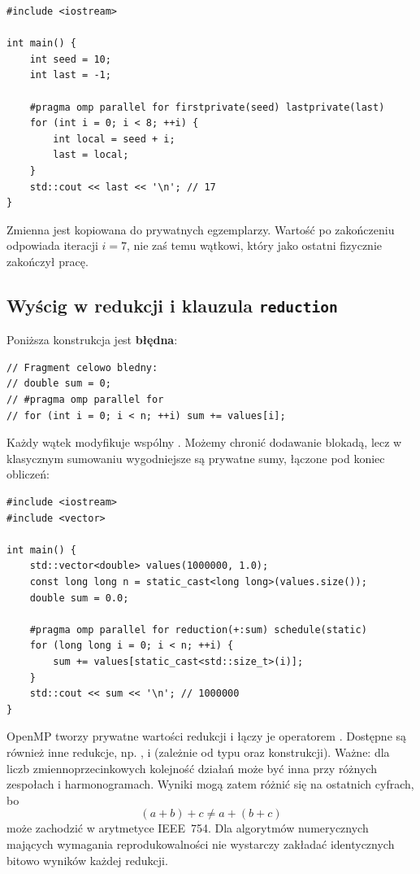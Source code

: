 \begin{lstlisting}[caption={Przykład firstprivate i lastprivate w OpenMP.}]
#include <iostream>

int main() {
    int seed = 10;
    int last = -1;

    #pragma omp parallel for firstprivate(seed) lastprivate(last)
    for (int i = 0; i < 8; ++i) {
        int local = seed + i;
        last = local;
    }
    std::cout << last << '\n'; // 17
}
\end{lstlisting}

Zmienna  jest kopiowana do prywatnych egzemplarzy.
Wartość  po zakończeniu odpowiada iteracji $i=7$,
nie zaś temu wątkowi, który jako ostatni fizycznie zakończył pracę.

\subsection{Wyścig w redukcji i klauzula \texttt{reduction}}

Poniższa konstrukcja jest \textbf{błędna}:
\begin{lstlisting}[caption={NIEPOPRAWNIE: konfliktowe modyfikacje sumy.}]
// Fragment celowo bledny:
// double sum = 0;
// #pragma omp parallel for
// for (int i = 0; i < n; ++i) sum += values[i];
\end{lstlisting}

Każdy wątek modyfikuje wspólny . Możemy chronić dodawanie
blokadą, lecz w klasycznym sumowaniu wygodniejsze są prywatne sumy,
łączone pod koniec obliczeń:

\begin{lstlisting}[caption={Redukcja równoległa w OpenMP.}]
#include <iostream>
#include <vector>

int main() {
    std::vector<double> values(1000000, 1.0);
    const long long n = static_cast<long long>(values.size());
    double sum = 0.0;

    #pragma omp parallel for reduction(+:sum) schedule(static)
    for (long long i = 0; i < n; ++i) {
        sum += values[static_cast<std::size_t>(i)];
    }
    std::cout << sum << '\n'; // 1000000
}
\end{lstlisting}

OpenMP tworzy prywatne wartości redukcji i łączy je operatorem
\code{+}. Dostępne są również inne redukcje, np. \code{*},
 i  (zależnie od typu oraz konstrukcji).
Ważne: dla liczb zmiennoprzecinkowych kolejność działań może być
inna przy różnych zespołach i harmonogramach. Wyniki mogą zatem
różnić się na ostatnich cyfrach, bo
\[
 (a+b)+c\ne a+(b+c)
\]
może zachodzić w arytmetyce IEEE~754. Dla algorytmów numerycznych
mających wymagania reprodukowalności nie wystarczy zakładać
identycznych bitowo wyników każdej redukcji.

